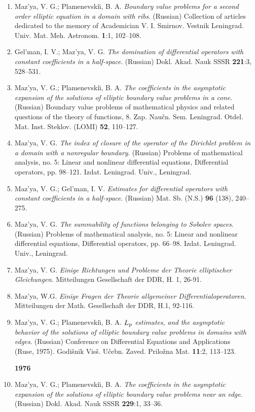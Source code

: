 \documentclass{article}
\begin{document}
\begin{enumerate}
{\bf 1975}
\item Maz'ya, V. G.; Plamenevski{\u\i}, B. A. {\it Boundary value
problems
for a second order elliptic equation in a
domain with ribs}.
(Russian) Collection of articles dedicated to the memory of
Academician V.
I. Smirnov. Vestnik Leningrad. Univ. Mat.
Meh. Astronom. {\bf 1}:1, 102--108.
\item Gel'man, I. V.; Maz'ya, V. G. {\it The domination of
differential
operators with constant coefficients in a half-space}.
(Russian) Dokl. Akad. Nauk SSSR {\bf 221}:3, 528--531.
\item Maz'ya, V. G.; Plamenevski{\u\i}, B. A.
   {\it The coefficients in the asymptotic expansion of the solutions
of
elliptic boundary value problems in a cone}. (Russian) Boundary value
problems of mathematical physics and related questions of the theory
of
functions, 8. Zap. Nau\v cn. Sem. Leningrad. Otdel. Mat. Inst.
Steklov.
(LOMI) {\bf 52}, 110--127.
\item Maz'ya, V. G. {\it The index of closure of the operator of the
Dirichlet problem in a domain with a
nonregular boundary}. (Russian) Problems of mathematical analysis, no.
5:
Linear and nonlinear differential equations, Differential
operators, pp. 98--121. Izdat. Leningrad. Univ., Leningrad.
\item Maz'ya, V. G.; Gel'man, I. V. {\it Estimates for differential
operators with constant coefficients in a
half-space}. (Russian) Mat. Sb. (N.S.) {\bf 96} (138), 240--275.
\item Maz'ya, V. G. {\it The summability of functions belonging to
Sobolev
spaces}. (Russian) Problems of
mathematical analysis, no. 5: Linear and nonlinear differential
equations,
Differential operators, pp. 66--98. Izdat.
Leningrad. Univ., Leningrad.
\item Maz'ya, V. G. {\it Einige Richtungen und Probleme der Theorie
elliptischer Gleichungen}. Mitteilungen Gesellschaft der DDR,
H. 1, 26-91.
\item Maz'ya, W.G. {\it Einige Fragen der Theorie allgemeiner
Differentialoperatoren}. Mitteilungen der Math. Gesellschaft der DDR,
H.1, 92-116.
\item Maz'ya, V. G.; Plamenevski{\u\i}, B. A. {\it $L\sb{p}$
estimates, and
the asymptotic behavior of the solutions of elliptic boundary value
problems
in domains with edges}. (Russian) Conference on Differential Equations
and
Applications (Ruse, 1975). Godi\v snik Vis\v s. U\v cebn. Zaved.
Prilo\v zna Mat. {\bf 11}:2, 113--123.

{\bf 1976}
\item Maz'ya, V. G.; Plamenevski{\u\i}, B. A. {\it The coefficients in
the
asymptotic expansion of the solutions of
elliptic boundary value problems near an edge}. (Russian) Dokl. Akad.
Nauk
SSSR {\bf 229}:1, 33--36.


\end{enumerate}
\end{document}
